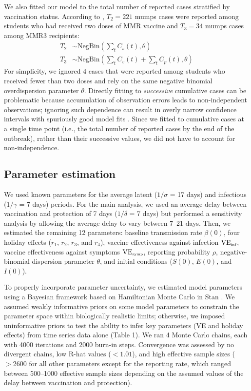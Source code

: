 \documentclass[12pt]{article}
\begin{document}
We also fitted our model to the total number of reported cases stratified by vaccination status.
According to \cite{cardemil2017effectiveness}, $T_2 = 221$ mumps cases were reported among students who had received two doses of MMR vaccine and $T_3 = 34$ mumps cases among MMR3 recipients:
\begin{align}
T_2 &\sim \mathrm{NegBin}\left(\sum_{t} C_s(t), \theta\right)\\
T_3 &\sim \mathrm{NegBin}\left(\sum_{t} C_v(t) + \sum_{t} C_p(t), \theta\right)
\end{align}
For simplicity, we ignored 4 cases that were reported among students who received fewer than two doses and rely on the same negative binomial overdispersion parameter $\theta$.
Directly fitting to \emph{successive} cumulative cases can be problematic because accumulation of observation errors leads to non-independent observations;
ignoring such dependence can result in overly narrow confidence intervals with spuriously good model fits \citep{king2015avoidable}.
Since we fitted to cumulative cases at a single time point (i.e., the total number of reported cases by the end of the outbreak), rather than their successive values, we did not have to account for non-independence.

\subsection{Parameter estimation}

We used known parameters for the average latent ($1/\sigma$ = 17 days) and infectious ($1/\gamma$ = 7 days) periods.
For the main analysis, we used an average delay between vaccination and protection of 7 days ($1/\delta$ = 7 days) but performed a sensitivity analysis by allowing the average delay to vary between 7--21 days.
Then, we estimated the remaining 12 parameters: baseline transmission rate $\beta(0)$, four holiday effects ($r_1$, $r_2$, $r_3$, and $r_4$), vaccine effectiveness against infection $\mathrm{VE}_{\textrm{\tiny{inf}}}$, vaccine effectiveness against symptoms $\mathrm{VE}_{\textrm{\tiny{symp}}}$, reporting probability $\rho$, negative-binomial dispersion parameter $\theta$, and initial conditions ($S(0)$, $E(0)$, and $I(0)$).

To properly incorporate parameter uncertainty, we estimated model parameters using a Bayesian framework based on Hamiltonian Monte Carlo in Stan \citep{carpenter2017stan}.
We assumed weakly informative priors on some model parameters to constrain the parameter space within biologically realistic limits;
otherwise, we imposed uninformative priors to test the ability to infer key parameters (VE and holiday effects) from time series data alone (Table 1).
We ran 4 Monte Carlo chains, each with 4000 iterations and 2000 burn-in steps.
Convergence was assessed by no divergent chains, low R-hat values ($< 1.01$), and high effective sample sizes ($>2600$ for all other parameters except for the reporting rate, which ranged between 500--1000 effective sample sizes depending on the assumed values of the delay between vaccination and protection).
\end{document}
